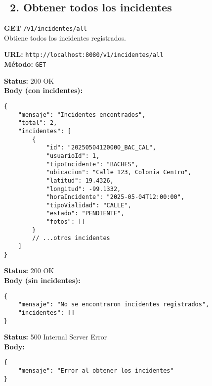 \subsection*{\faServer\ 2. Obtener todos los incidentes}
\begin{tcolorbox}[endpoint]
    \textbf{GET} \texttt{/v1/incidentes/all}\\
    Obtiene todos los incidentes registrados.
\end{tcolorbox}

\begin{tcolorbox}[request]
    \textbf{URL:} \textcolor{urlColor}{\texttt{http://localhost:8080/v1/incidentes/all}}\\
    \textbf{Método:} \textcolor{methodColor}{\texttt{GET}}
\end{tcolorbox}

\begin{tcolorbox}[response]
    \textbf{Status:} 200 OK\\
    \textbf{Body (con incidentes):}
    \begin{verbatim}
{
    "mensaje": "Incidentes encontrados",
    "total": 2,
    "incidentes": [
        {
            "id": "20250504120000_BAC_CAL",
            "usuarioId": 1,
            "tipoIncidente": "BACHES",
            "ubicacion": "Calle 123, Colonia Centro",
            "latitud": 19.4326,
            "longitud": -99.1332,
            "horaIncidente": "2025-05-04T12:00:00",
            "tipoVialidad": "CALLE",
            "estado": "PENDIENTE",
            "fotos": []
        }
        // ...otros incidentes
    ]
}
    \end{verbatim}
\end{tcolorbox}

\begin{tcolorbox}[response]
    \textbf{Status:} 200 OK\\
    \textbf{Body (sin incidentes):}
    \begin{verbatim}
{
    "mensaje": "No se encontraron incidentes registrados",
    "incidentes": []
}
    \end{verbatim}
\end{tcolorbox}

\begin{tcolorbox}[response]
    \textbf{Status:} 500 Internal Server Error\\
    \textbf{Body:}
    \begin{verbatim}
{
    "mensaje": "Error al obtener los incidentes"
}
    \end{verbatim}
\end{tcolorbox}

